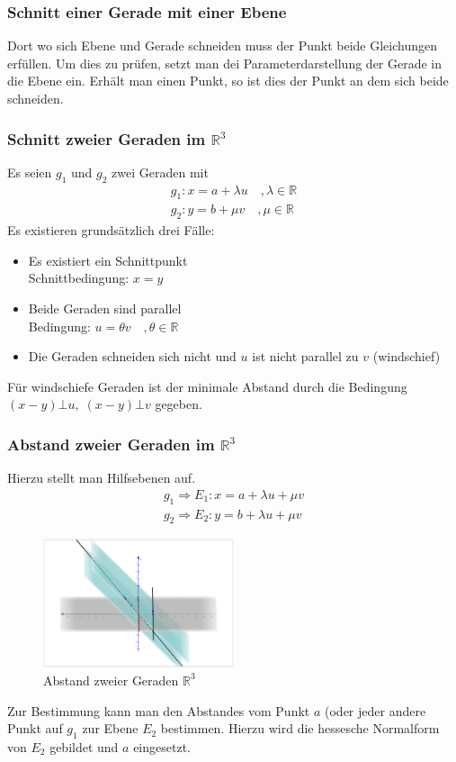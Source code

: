\documentclass[12pt,a4paper]{article}%
\numberwithin{equation}{section}
\newcommand{\R}{\mathbb{R}} %
\numberwithin{equation}{subsection}
\begin{document}
	  \subsubsection{Schnitt einer Gerade mit einer Ebene}
	  Dort wo sich Ebene und Gerade schneiden muss der Punkt beide Gleichungen erfüllen. Um dies zu prüfen, setzt man dei Parameterdarstellung der Gerade in die Ebene ein. Erhält man einen Punkt, so ist dies der Punkt an dem sich beide schneiden.
	  \subsubsection{Schnitt zweier Geraden im $\R^3$}
	  Es seien $g_1$ und $g_2$ zwei Geraden mit
	  \begin{align*}
	    g_1: x = a + \lambda u \quad, \lambda \in \R\\
	    g_2: y = b + \mu v \quad, \mu \in \R
	  \end{align*}
	  Es existieren grundsätzlich drei Fälle:
	  \begin{itemize}
	    \item Es existiert ein Schnittpunkt \\
	      Schnittbedingung: $x = y$
	    \item Beide Geraden sind parallel \\
	      Bedingung: $u = \theta v \quad, \theta \in \R$
	    \item Die Geraden schneiden sich nicht und $u$ ist nicht parallel zu $v$ (windschief)
	  \end{itemize}
	  Für windschiefe Geraden ist der minimale Abstand durch die Bedingung $(x-y) \bot u,\; (x-y) \bot v$ gegeben.
	  \subsubsection{Abstand zweier Geraden im $\R^3$}
	  Hierzu stellt man Hilfsebenen auf.
	  \begin{align*}
	    g_1 \Rightarrow E_1: x = a + \lambda u + \mu v \\
	    g_2 \Rightarrow E_2: y = b + \lambda u + \mu v
	  \end{align*}
	  \begin{figure}[H] 
		  \centering
		  \includegraphics[width=0.5\textwidth]{Abstand_Geraden.png}
		  \caption{Abstand zweier Geraden $\R^3$}
		  \label{fig:abstand_geraden}
	  \end{figure}
	  Zur Bestimmung kann man den Abstandes vom Punkt $a$ (oder jeder andere Punkt auf $g_1$ zur Ebene $E_2$ bestimmen. Hierzu wird die hessesche Normalform von $E_2$ gebildet und $a$ eingesetzt.
\newpage
\end{document}
